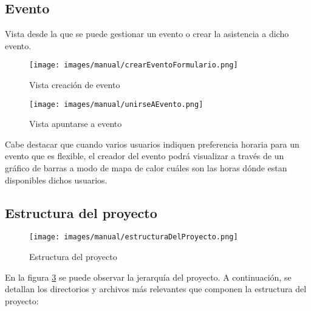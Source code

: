 \subsection{Evento}
Vista desde la que se puede gestionar un evento o crear la asistencia a dicho evento.
\begin{figure}[H]
        \centering
        \texttt{[image: images/manual/crearEventoFormulario.png]}
        \caption{Vista creación de evento}
        \label{fig:Eventos}
\end{figure}
\begin{figure}[H]
        \centering
        \texttt{[image: images/manual/unirseAEvento.png]}
        \caption{Vista apuntarse a evento}
        \label{fig:Vista unirse evento}
\end{figure}
Cabe destacar que cuando varios usuarios indiquen preferencia horaria para un evento que es flexible, el creador del evento podrá visualizar a través de un gráfico de barras a modo de mapa de calor cuáles son las horas dónde estan disponibles dichos usuarios.

\subsection{Estructura del proyecto}
\begin{figure}[H]
        \centering
        \texttt{[image: images/manual/estructuraDelProyecto.png]}
        \caption{Estructura del proyecto}
        \label{fig:estructuraProyecto}
\end{figure}
En la figura \ref{fig:estructuraProyecto} se puede observar la jerarquía del proyecto. A continuación, se detallan los directorios y archivos más relevantes que componen la estructura del proyecto:

